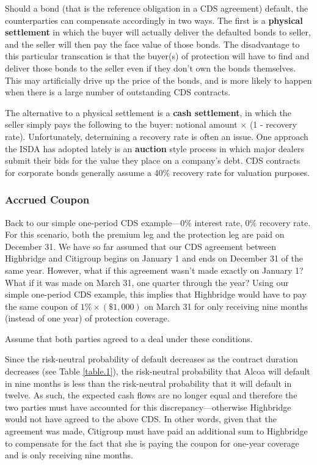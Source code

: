 \documentclass{jss}
\begin{document}
Should a bond (that is the reference obligation in a CDS agreement) default, the counterparties can compensate accordingly in two ways. The first is a \textbf{physical settlement} in which the buyer will actually deliver the defaulted bonds to seller, and the seller will then pay the face value of those bonds. The disadvantage to this particular transcation is that the buyer(s) of protection will have to find and deliver those bonds to the seller even if they don't own the bonds themselves. This may artificially drive up the price of the bonds, and is more likely to happen when there is a large number of outstanding CDS contracts. 

The alternative to a physical settlement is a \textbf{cash settlement}, in which the seller simply pays the following to the buyer: notional amount $\times$ (1 - recovery rate). Unfortunately, determining a recovery rate is often an issue. One approach the ISDA has adopted lately is an \textbf{auction} style process in which major dealers submit their bids for the value they place on a company's debt.  CDS contracts for corporate bonds generally assume a 40\% recovery rate for valuation purposes.

\subsubsection{Accrued Coupon}
\label{sec:AccruedCoupon}

Back to our simple one-period CDS example---0\% interest rate, 0\% recovery rate. For this scenario, both the premium leg and the protection leg are paid on December 31. We have so far assumed that our CDS agreement between Highbridge and Citigroup begins on January 1 and ends on December 31 of the same year. However, what if this agreement wasn't made exactly on January 1? What if it was made on March 31, one quarter through the year? Using our simple one-period CDS example, this implies that Highbridge would have to pay the same coupon of $1\% \times (\$1,000)$ on March 31 for only receiving nine months (instead of one year) of protection coverage.

Assume that both parties agreed to a deal under these conditions. 

Since the risk-neutral probability of default decreases as the contract duration decreases (see Table \ref{table.1}), the risk-neutral probability that Alcoa will default in nine months is less than the risk-neutral probability that it will default in twelve. As such, the expected cash flows are no longer equal and therefore the two parties must have accounted for this discrepancy---otherwise Highbridge would not have agreed to the above CDS. In other words, given that the agreement was made, Citigroup must have paid an additional sum to Highbridge to compensate for the fact that she is paying the coupon for one-year coverage and is only receiving nine months.
\end{document}

